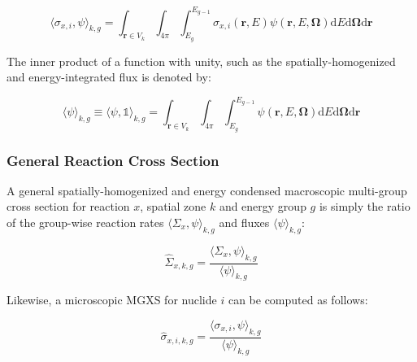 \begin{equation}
\label{eqn:angle-rxn-rate}
\langle \sigma_{x,i}, \psi \rangle_{k,g} = \int_{\mathbf{r} \in V_{k}} \int_{4\pi} \int_{E_{g}}^{E_{g-1}} \sigma_{x,i}(\mathbf{r},E)\psi(\mathbf{r},E,\mathbf{\Omega}) \mathrm{d}E\mathrm{d}\mathbf{\Omega}\mathrm{d}\mathbf{r}
\end{equation}

\noindent The inner product of a function with unity, such as the spatially-homogenized and energy-integrated flux is denoted by:

\begin{equation}
\label{eqn:angle-flux}
\langle \psi \rangle_{k,g} \equiv \langle \psi, \mathbb{1} \rangle_{k,g} = \int_{\mathbf{r} \in V_{k}} \int_{4\pi} \int_{E_{g}}^{E_{g-1}} \psi(\mathbf{r},E,\mathbf{\Omega}) \mathrm{d}E\mathrm{d}\mathbf{\Omega}\mathrm{d}\mathbf{r}
\end{equation}


\subsubsection{General Reaction Cross Section}
\label{subsubsec:tally-types-gen-xs}

A general spatially-homogenized and energy condensed macroscopic multi-group cross section for reaction $x$, spatial zone $k$ and energy group $g$ is simply the ratio of the group-wise reaction rates $\langle \Sigma_{x}, \psi \rangle_{k,g}$ and fluxes $\langle \psi \rangle_{k,g}$:

\begin{equation}
\label{eqn:general-macro}
\hat{\Sigma}_{x,k,g} = \frac{\langle \Sigma_{x}, \psi \rangle_{k,g}}{\langle \psi \rangle_{k,g}}
\end{equation}

\noindent Likewise, a microscopic MGXS for nuclide $i$ can be computed as follows:

\begin{equation}
\label{eqn:general-micro}
\hat{\sigma}_{x,i,k,g} = \frac{\langle \sigma_{x,i}, \psi \rangle_{k,g}}{\langle \psi \rangle_{k,g}}
\end{equation}

